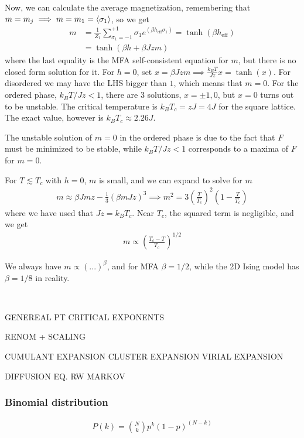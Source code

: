\documentclass[a4paper, english, 12pt]{article}
\newcommand{\closed}[1]{\left( #1 \right)}
\begin{document}
\begin{multicols*}{2}
Now, we can calculate the average magnetization, remembering that $m=m_j\implies m=m_1=\expval{\sigma_1}$, so we get 
\begin{align*}
    m &= \frac{1}{Z_1} \sum_{\sigma_1=-1}^{+1} \sigma_1 e^{(\beta h_{\mathrm{eff}}\sigma_1)} = \tanh(\beta h_{\mathrm{eff}}) \\ 
    &= \tanh(\beta h + \beta Jzm)
\end{align*}
where the last equality is the MFA self-consistent equation for $m$, but there is no closed form solution for it. For $h=0$, set $x=\beta J zm\implies \frac{k_B T}{Jz}x=\tanh(x)$. For disordered we may have the LHS bigger than $1$, which means that $m=0$. For the ordered phase, $k_B T/Jz < 1$, there are $3$ solutions, $x=\pm1,0$, but $x=0$ turns out to be unstable. The critical temperature is $k_B T_c=zJ=4J$ for the square lattice. The exact value, however is $k_B T_c\approx 2.26 J$.   

The unstable solution of $m=0$ in the ordered phase is due to the fact that $F$ must be minimized to be stable, while $k_B T/Jz < 1$ corresponds to a maxima of $F$ for $m=0$.  


For $T\lesssim T_c$ with $h=0$, $m$ is small, and we can expand to solve for $m$
\begin{align*}
    m \approx \beta J m z - \frac{1}{3} (\beta m J z)^3 \implies m^2 = 3 \closed{\frac{T}{T_c}}^2 \closed{1-\frac{T}{T_c}} 
\end{align*}
where we have used that $Jz=k_B T_c$. Near $T_c$, the squared term is negligible, and we get 
\begin{align*}
    m \propto \closed{\frac{T_c-T}{T_c}}^{1/2}
\end{align*}

We always have $m\propto(...)^{\beta}$, and for MFA $\beta=1/2$, while the 2D Ising model has $\beta=1/8$ in reality. 

\



GENEREAL PT 
CRITICAL EXPONENTS 

RENOM + SCALING 


CUMULANT EXPANSION 
CLUSTER EXPANSION 
VIRIAL EXPANSION 


DIFFUSION EQ. RW
MARKOV 


\subsubsection*{\scriptsize Binomial distribution}
\begin{align*}
    P(k) = \binom{N}{k} p^k (1-p)^{(N-k)}
\end{align*}



\end{multicols*}
\end{document}
